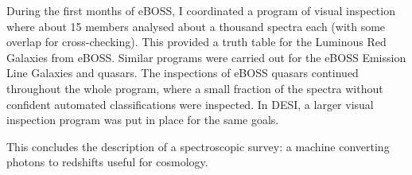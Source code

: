 During the first months of eBOSS, I coordinated a program of 
visual inspection where about 15 members analysed about a thousand spectra each
(with some overlap for cross-checking). This provided a truth table
for the Luminous Red Galaxies from eBOSS. Similar programs were carried out
for the eBOSS Emission Line Galaxies and quasars. The inspections of eBOSS quasars
continued throughout the whole program, where a small fraction of
the spectra without confident automated classifications were inspected.
In DESI, a larger visual inspection program was put in place for the same goals.

This concludes the description of a spectroscopic survey: 
a machine converting photons to redshifts useful for cosmology.  